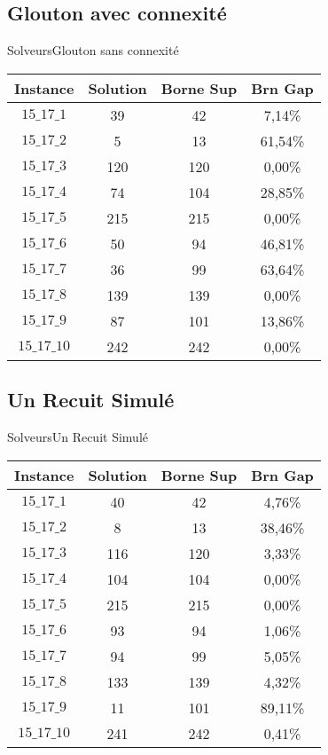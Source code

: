 \documentclass[10pt]{beamer}
\begin{document}
\subsection{Glouton avec connexité}
\begin{frame}{Solveurs}{Glouton sans connexité}
\begin{center}
      \begin{tabular}{|c|c|c|c|}
      \hline 
        Instance & Solution & Borne Sup & Brn Gap  \\ \hline
$15\_17\_1$ & 39 &   42 &   7,14\% \\ \hline
$15\_17\_2$ & 5 &  13 &   61,54\% \\ \hline
$15\_17\_3$ & 120 &  120 &  0,00\% \\ \hline
$15\_17\_4$ & 74 &   104 &  28,85\% \\ \hline
$15\_17\_5$ & 215 &  215 &  0,00\% \\ \hline
$15\_17\_6$ & 50 &   94 &   46,81\% \\ \hline
$15\_17\_7$ & 36 &   99 &   63,64\% \\ \hline
$15\_17\_8$ & 139 &  139 &  0,00\% \\ \hline
$15\_17\_9$ & 87 &   101 &  13,86\% \\ \hline
$15\_17\_10$ &242 &  242 &  0,00\% \\ \hline
      \end{tabular}
      \end{center}
\end{frame}

\subsection{Un Recuit Simulé}
\begin{frame}{Solveurs}{Un Recuit Simulé}
\begin{center}
      \begin{tabular}{|c|c|c|c|}
      \hline 
        Instance & Solution & Borne Sup & Brn Gap  \\ \hline
$15\_17\_1$ &  40 &  42 &  4,76\% \\ \hline
$15\_17\_2$ &  8 & 13 &  38,46\% \\ \hline
$15\_17\_3$ &  116 & 120 & 3,33\% \\ \hline
$15\_17\_4$ &  104 & 104 & 0,00\% \\ \hline
$15\_17\_5$ &  215 & 215 & 0,00\% \\ \hline
$15\_17\_6$ &  93 &  94 &  1,06\% \\ \hline
$15\_17\_7$ &  94 &  99 &  5,05\% \\ \hline
$15\_17\_8$ &  133 & 139 & 4,32\% \\ \hline
$15\_17\_9$ &  11 &  101 & 89,11\% \\ \hline
$15\_17\_10$ & 241 & 242 & 0,41\% \\ \hline
      \end{tabular}
      \end{center}
\end{frame}
\end{document}

